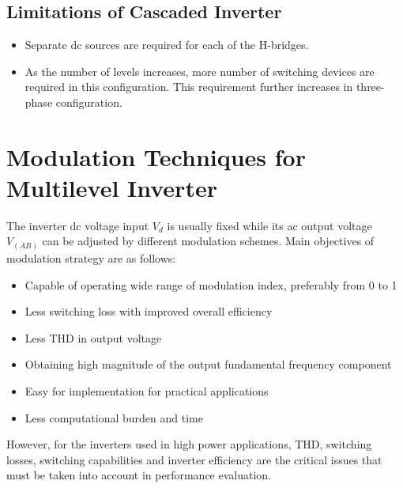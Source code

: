 \subsection{Limitations of Cascaded Inverter}
\begin{itemize}
\item Separate dc sources are required for each of the H-bridges.
\item As the number of levels increases, more number of switching devices are required in this configuration. This requirement further increases in three-phase configuration.
\end{itemize}
\section{Modulation Techniques for Multilevel Inverter}
 The inverter dc voltage input $V_d$ is usually fixed while its ac output voltage $V_(AB)$ can be adjusted by different modulation schemes.
Main objectives of modulation strategy are as follows:
\begin{itemize}
\item Capable of operating wide range of modulation index, preferably
from 0 to 1
\item Less switching loss with improved overall efficiency
\item Less THD in output voltage
\item Obtaining high magnitude of the output fundamental frequency
component
\item Easy for implementation for practical applications
\item Less computational burden and time
\end{itemize}
However, for the inverters used in high power applications,
THD, switching losses, switching capabilities and inverter
efficiency are the critical issues that must be taken into account in
performance evaluation.
